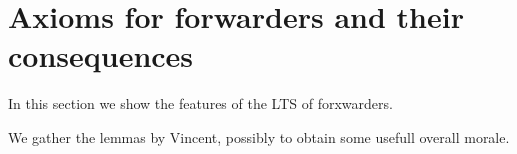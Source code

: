 \section{Axioms for forwarders and their consequences}
In this section we show the features of the LTS of forxwarders.

We gather the lemmas by Vincent, possibly to obtain some
usefull overall morale.
